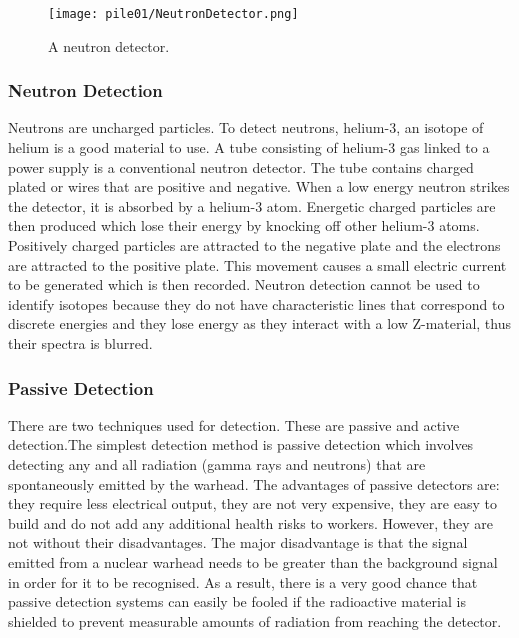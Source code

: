 \documentclass[twoside,titlepage,11pt,twocolumn,a4paper]{article}
\begin{document}
\begin{figure}
  \texttt{[image: pile01/NeutronDetector.png]}
  \caption{A neutron detector. \citep{nucsafe}}
\end{figure}

\subsubsection{Neutron Detection}

Neutrons are uncharged particles. To detect neutrons, helium-3, an
isotope of helium is a good material to use. A tube consisting of
helium-3 gas linked to a power supply is a conventional neutron
detector. The tube contains charged plated or wires that are positive
and negative. When a low energy neutron strikes the detector, it is
absorbed by a helium-3 atom.  Energetic charged particles are then
produced which lose their energy by knocking off other helium-3
atoms. Positively charged particles are attracted to the negative
plate and the electrons are attracted to the positive plate. This
movement causes a small electric current to be generated which is then
recorded. Neutron detection cannot be used to identify isotopes
because they do not have characteristic lines that correspond to
discrete energies and they lose energy as they interact with a low
Z-material, thus their spectra is blurred. \citep{bushberg1994}

\subsubsection{Passive Detection}

There are two techniques used for detection. These are passive and
active detection.The simplest detection method is passive detection
which involves detecting any and all radiation (gamma rays and
neutrons) that are spontaneously emitted by the
warhead. \citep{hippel1990} The advantages of passive detectors are:
they require less electrical output, they are not very expensive, they
are easy to build and do not add any additional health risks to
workers. However, they are not without their disadvantages. The major
disadvantage is that the signal emitted from a nuclear warhead needs
to be greater than the background signal in order for it to be
recognised. As a result, there is a very good chance that passive
detection systems can easily be fooled if the radioactive material is
shielded to prevent measurable amounts of radiation from reaching the
detector. \citep{nuclearDetArch2009}
\end{document}

